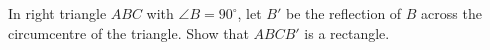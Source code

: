 In right triangle $ABC$ with $\angle B=90^\circ$, let $B'$ be the reflection of $B$ across the circumcentre of the triangle. Show that $ABCB'$ is a rectangle.
